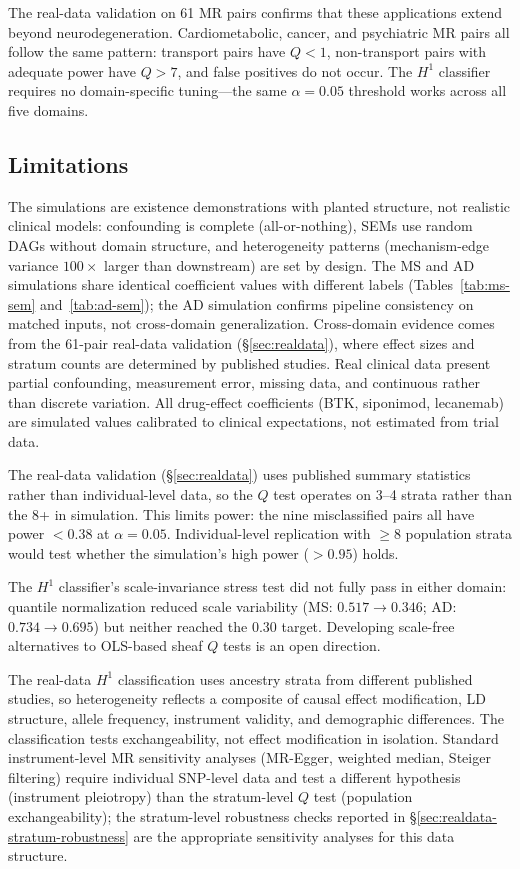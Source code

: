 \documentclass[11pt]{article}
\begin{document}
The real-data validation on 61 MR pairs confirms that these applications extend beyond neurodegeneration.
Cardiometabolic, cancer, and psychiatric MR pairs all follow the same pattern: transport pairs have $Q < 1$, non-transport pairs with adequate power have $Q > 7$, and false positives do not occur. The $H^1$ classifier requires no domain-specific tuning---the same $\alpha = 0.05$ threshold works across all five domains.

\subsection{Limitations}

The simulations are existence demonstrations with planted structure, not realistic clinical models: confounding is complete (all-or-nothing), SEMs use random DAGs without domain structure, and heterogeneity patterns (mechanism-edge variance $100\times$ larger than downstream) are set by design.
The MS and AD simulations share identical coefficient values with different labels (Tables~\ref{tab:ms-sem} and~\ref{tab:ad-sem}); the AD simulation confirms pipeline consistency on matched inputs, not cross-domain generalization. Cross-domain evidence comes from the 61-pair real-data validation (\S\ref{sec:realdata}), where effect sizes and stratum counts are determined by published studies.
Real clinical data present partial confounding, measurement error, missing data, and continuous rather than discrete variation.
All drug-effect coefficients (BTK, siponimod, lecanemab) are simulated values calibrated to clinical expectations, not estimated from trial data.

The real-data validation (\S\ref{sec:realdata}) uses published summary statistics rather than individual-level data, so the $Q$ test operates on 3--4 strata rather than the 8+ in simulation.
This limits power: the nine misclassified pairs all have power $< 0.38$ at $\alpha = 0.05$.
Individual-level replication with $\geq 8$ population strata would test whether the simulation's high power ($> 0.95$) holds.

The $H^1$ classifier's scale-invariance stress test did not fully pass in either domain: quantile normalization reduced scale variability (MS: $0.517 \to 0.346$; AD: $0.734 \to 0.695$) but neither reached the $0.30$ target.
Developing scale-free alternatives to OLS-based sheaf $Q$ tests is an open direction.

The real-data $H^1$ classification uses ancestry strata from different published studies, so heterogeneity reflects a composite of causal effect modification, LD structure, allele frequency, instrument validity, and demographic differences.
The classification tests exchangeability, not effect modification in isolation.
Standard instrument-level MR sensitivity analyses (MR-Egger, weighted median, Steiger filtering) require individual SNP-level data and test a different hypothesis (instrument pleiotropy) than the stratum-level $Q$ test (population exchangeability); the stratum-level robustness checks reported in \S\ref{sec:realdata-stratum-robustness} are the appropriate sensitivity analyses for this data structure.
\end{document}
